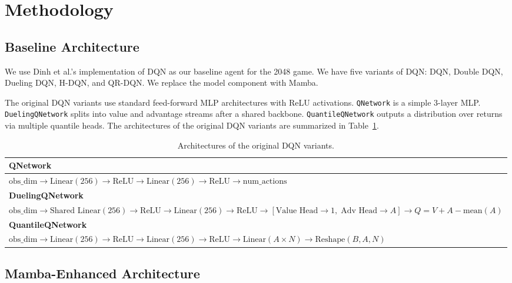 \documentclass[conference]{IEEEtran}
\begin{document}
\section{Methodology}

\subsection{Baseline Architecture}

We use Dinh et al.'s implementation of DQN as our baseline agent for the 2048 game. We have five variants of DQN: DQN, Double DQN, Dueling DQN, H-DQN, and QR-DQN. We replace the model component with Mamba.

The original DQN variants use standard feed-forward MLP architectures with ReLU activations. \texttt{QNetwork} is a simple 3-layer MLP. \texttt{DuelingQNetwork} splits into value and advantage streams after a shared backbone. \texttt{QuantileQNetwork} outputs a distribution over returns via multiple quantile heads. The architectures of the original DQN variants are summarized in Table~\ref{tab:original_arch}.

\begin{table}[H]
\centering
\caption{Architectures of the original DQN variants.}
\label{tab:original_arch}
\small
\begin{tabular}{@{}p{}@{}}
\toprule
\textbf{QNetwork} \\
\midrule
$\text{obs\_dim} \rightarrow \text{Linear}(256) \rightarrow \text{ReLU} \rightarrow \text{Linear}(256) \rightarrow \text{ReLU} \rightarrow \text{num\_actions}$ \\
\midrule
\textbf{DuelingQNetwork} \\
\midrule
$\text{obs\_dim} \rightarrow \text{Shared Linear}(256) \rightarrow \text{ReLU} \rightarrow \text{Linear}(256) \rightarrow \text{ReLU} \rightarrow [\text{Value Head} \rightarrow 1,\; \text{Adv Head} \rightarrow A] \rightarrow Q = V + A - \text{mean}(A)$ \\
\midrule
\textbf{QuantileQNetwork} \\
\midrule
$\text{obs\_dim} \rightarrow \text{Linear}(256) \rightarrow \text{ReLU} \rightarrow \text{Linear}(256) \rightarrow \text{ReLU} \rightarrow \text{Linear}(A \times N) \rightarrow \text{Reshape}(B, A, N)$ \\
\bottomrule
\end{tabular}
\end{table}

\subsection{Mamba-Enhanced Architecture}
\end{document}
